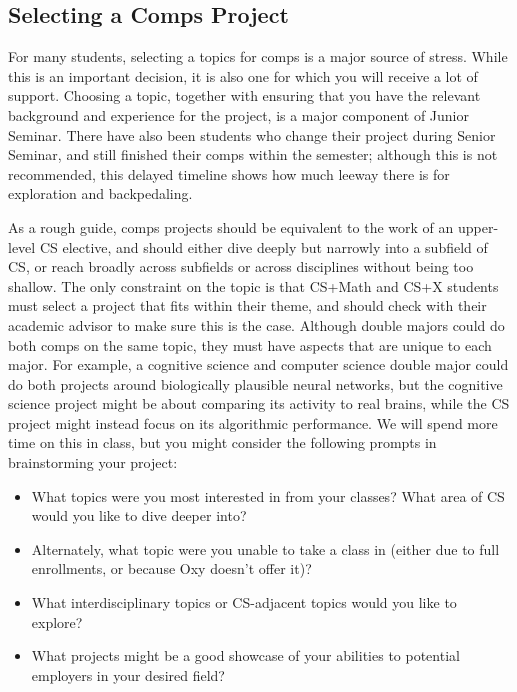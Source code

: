 \documentclass[10pt,twocolumn]{article}
\begin{document}
\subsection{Selecting a Comps Project}

For many students, selecting a topics for comps is a major source of stress.
While this is an important decision, it is also one for which you will receive a lot of support.
Choosing a topic, together with ensuring that you have the relevant background and experience for the project, is a major component of Junior Seminar.
There have also been students who change their project during Senior Seminar, and still finished their comps within the semester; although this is not recommended, this delayed timeline shows how much leeway there is for exploration and backpedaling.

As a rough guide, comps projects should be equivalent to the work of an upper-level CS elective, and should either dive deeply but narrowly into a subfield of CS, or reach broadly across subfields or across disciplines without being too shallow.
The only constraint on the topic is that CS+Math and CS+X students must select a project that fits within their theme, and should check with their academic advisor to make sure this is the case.
Although double majors could do both comps on the same topic, they must have aspects that are unique to each major.
For example, a cognitive science and computer science double major could do both projects around biologically plausible neural networks, but the cognitive science project might be about comparing its activity to real brains, while the CS project might instead focus on its algorithmic performance.
We will spend more time on this in class, but you might consider the following prompts in brainstorming your project:

\begin{itemize}
    \item What topics were you most interested in from your classes? What area of CS would you like to dive deeper into?
    \item Alternately, what topic were you unable to take a class in (either due to full enrollments, or because Oxy doesn't offer it)?
    \item What interdisciplinary topics or CS-adjacent topics would you like to explore?
    \item What projects might be a good showcase of your abilities to potential employers in your desired field?
\end{itemize}
\end{document}
